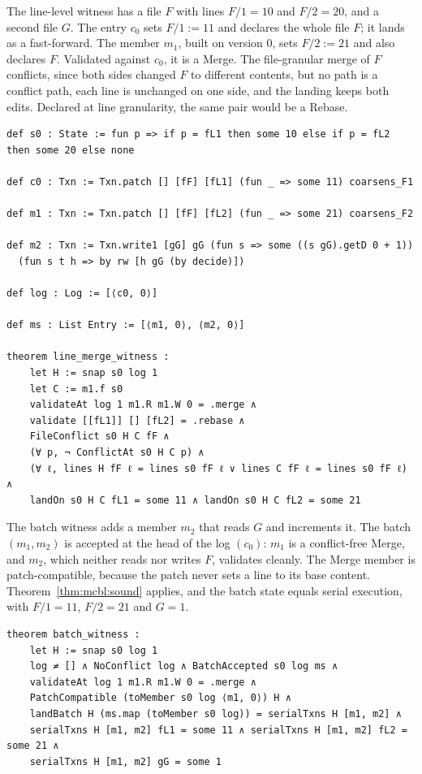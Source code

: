 \documentclass[11pt,letterpaper]{article}
\theoremstyle{definition}
\theoremstyle{remark}
\begin{document}
The line-level witness has a file $F$ with lines $F/1=10$ and $F/2=20$, and a second file $G$. The entry $c_0$ sets $F/1:=11$ and declares the whole file $F$; it lands as a fast-forward. The member $m_1$, built on version 0, sets $F/2:=21$ and also declares $F$. Validated against $c_0$, it is a Merge. The file-granular merge of $F$ conflicts, since both sides changed $F$ to different contents, but no path is a conflict path, each line is unchanged on one side, and the landing keeps both edits. Declared at line granularity, the same pair would be a Rebase.

\begin{lstlisting}[language=Lean,caption={The line-level merge witness (\texttt{YonedaTx/Witnesses.lean})},label={lst:mcbl:wline}]
def s0 : State := fun p => if p = fL1 then some 10 else if p = fL2 then some 20 else none

def c0 : Txn := Txn.patch [] [fF] [fL1] (fun _ => some 11) coarsens_F1

def m1 : Txn := Txn.patch [] [fF] [fL2] (fun _ => some 21) coarsens_F2

def m2 : Txn := Txn.write1 [gG] gG (fun s => some ((s gG).getD 0 + 1))
  (fun s t h => by rw [h gG (by decide)])

def log : Log := [⟨c0, 0⟩]

def ms : List Entry := [⟨m1, 0⟩, ⟨m2, 0⟩]

theorem line_merge_witness :
    let H := snap s0 log 1
    let C := m1.f s0
    validateAt log 1 m1.R m1.W 0 = .merge ∧
    validate [[fL1]] [] [fL2] = .rebase ∧
    FileConflict s0 H C fF ∧
    (∀ p, ¬ ConflictAt s0 H C p) ∧
    (∀ ℓ, lines H fF ℓ = lines s0 fF ℓ ∨ lines C fF ℓ = lines s0 fF ℓ) ∧
    landOn s0 H C fL1 = some 11 ∧ landOn s0 H C fL2 = some 21
\end{lstlisting}

The batch witness adds a member $m_2$ that reads $G$ and increments it. The batch $(m_1,m_2)$ is accepted at the head of the log $(c_0)$: $m_1$ is a conflict-free Merge, and $m_2$, which neither reads nor writes $F$, validates cleanly. The Merge member is patch-compatible, because the patch never sets a line to its base content. Theorem~\ref{thm:mcbl:sound} applies, and the batch state equals serial execution, with $F/1=11$, $F/2=21$ and $G=1$.

\begin{lstlisting}[language=Lean,caption={The batch witness (\texttt{YonedaTx/Witnesses.lean})},label={lst:mcbl:wbatch}]
theorem batch_witness :
    let H := snap s0 log 1
    log ≠ [] ∧ NoConflict log ∧ BatchAccepted s0 log ms ∧
    validateAt log 1 m1.R m1.W 0 = .merge ∧
    PatchCompatible (toMember s0 log ⟨m1, 0⟩) H ∧
    landBatch H (ms.map (toMember s0 log)) = serialTxns H [m1, m2] ∧
    serialTxns H [m1, m2] fL1 = some 11 ∧ serialTxns H [m1, m2] fL2 = some 21 ∧
    serialTxns H [m1, m2] gG = some 1
\end{lstlisting}
\end{document}
